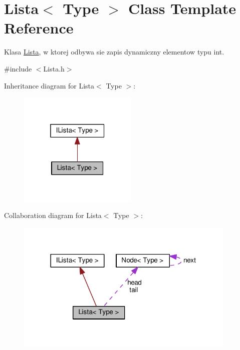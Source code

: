 \hypertarget{class_lista}{\section{Lista$<$ Type $>$ Class Template Reference}
\label{class_lista}
}


Klasa \hyperlink{class_lista}{Lista}, w ktorej odbywa sie zapis dynamiczny elementow typu int.  




{\ttfamily \#include $<$Lista.\-h$>$}



Inheritance diagram for Lista$<$ Type $>$\-:
\nopagebreak
\begin{figure}[H]
\begin{center}
\leavevmode
\includegraphics[width=160pt]{class_lista__inherit__graph}
\end{center}
\end{figure}


Collaboration diagram for Lista$<$ Type $>$\-:
\nopagebreak
\begin{figure}[H]
\begin{center}
\leavevmode
\includegraphics[width=298pt]{class_lista__coll__graph}
\end{center}
\end{figure}
